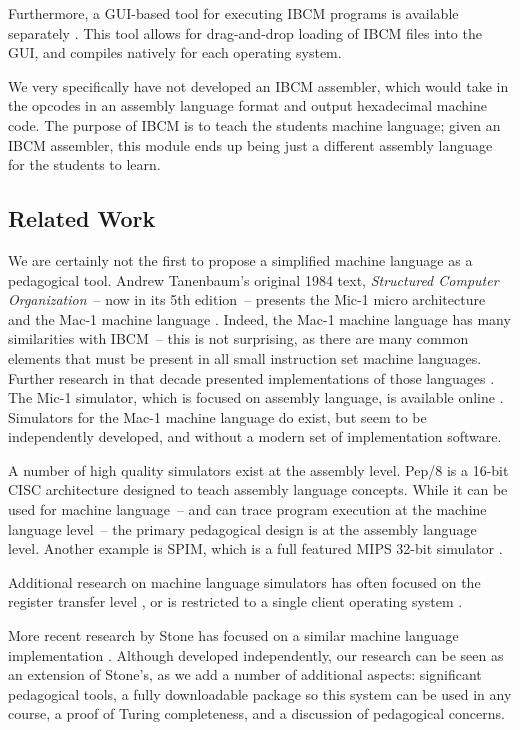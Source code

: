 Furthermore, a GUI-based tool for executing IBCM programs is available
separately \cite{jwelsh-ibcm}.
This tool allows for drag-and-drop loading of IBCM files into the
GUI, and compiles natively for each operating system.


We very specifically have not developed an IBCM assembler, which would
take in the opcodes in an assembly language format and output
hexadecimal machine code.  The purpose of IBCM is to teach the
students machine language; given an IBCM assembler, this module ends
up being just a different assembly language for the students to learn.

\subsection{Related Work}

We are certainly not the first to propose a simplified machine
language as a pedagogical tool.  Andrew Tanenbaum's original 1984
text, {\em Structured Computer Organization}~-- now in its 5th
edition~-- presents the Mic-1 micro architecture and the Mac-1 machine
language \cite{538160}.  Indeed, the Mac-1 machine language has many
similarities with IBCM~-- this is not surprising, as there are many
common elements that must be present in all small instruction set
machine languages.  Further research in that decade presented
implementations of those languages \cite{54147,152757}.  The Mic-1
simulator, which is focused on assembly language, is available online
\cite{mic-1-website}.  Simulators for the Mac-1 machine language do
exist, but seem to be independently developed, and without a modern
set of implementation software.

A number of high quality simulators exist at the assembly level.
Pep/8 \cite{warford:2010:PMT:1734263.1734389,warford2009computer} is a
16-bit CISC architecture designed to teach assembly language concepts.
While it can be used for machine language~-- and can trace program
execution at the machine language level~-- the primary pedagogical
design is at the assembly language level. Another example is SPIM,
which is a full featured MIPS 32-bit simulator \cite{spim-website}.

Additional research on machine language simulators has often focused
on the register transfer level \cite{107081}, or is restricted to a
single client operating system \cite{199795}.

More recent research by Stone has focused on a similar machine
language implementation \cite{1189166}.  Although developed
independently, our research can be seen as an extension of Stone's, as
we add a number of additional aspects: significant pedagogical tools,
a fully downloadable package so this system can be used in any course,
a proof of Turing completeness, and a discussion of pedagogical
concerns.  

